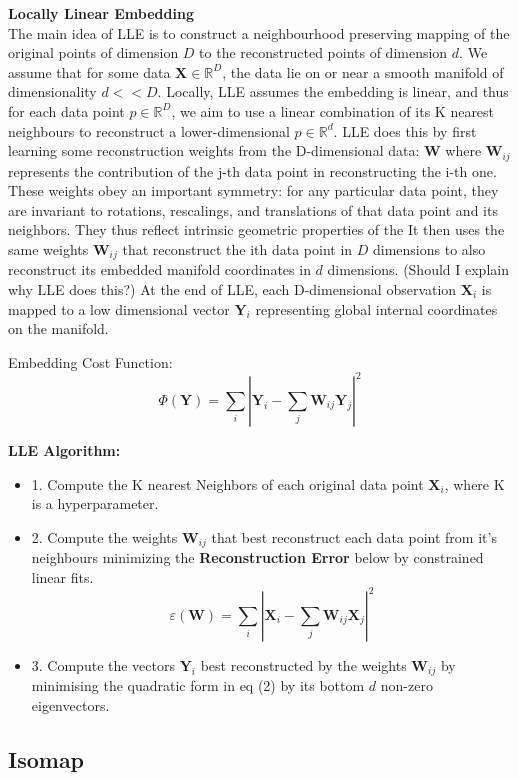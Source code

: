 \documentclass[12pt]{report}
\begin{document}
\textbf{Locally Linear Embedding} 
\\
The main idea of LLE is to construct a neighbourhood preserving mapping of the original points of dimension $D$ to the reconstructed points of dimension $d$. We assume that for some data $\textbf{X} \in \mathbb{R}^{D}$, the data lie on or near a smooth manifold of dimensionality $d << D$. Locally, LLE assumes the embedding is linear, and thus for each data point $p \in \mathbb{R}^D$, we aim to use a linear combination of its K nearest neighbours to reconstruct a lower-dimensional $p \in \mathbb{R}^d$. LLE does this by first learning some reconstruction weights from the D-dimensional data: $\textbf{W}$ where $\textbf{W}_{ij}$ represents the contribution of the j-th data point in reconstructing the i-th one. These weights obey an important symmetry: for any particular data point, they are invariant to rotations, rescalings, and translations of that data point and its neighbors. They thus reflect intrinsic geometric properties of the  It then uses the same weights $\textbf{W}_{ij}$ that reconstruct the ith data point in $D$ dimensions to also reconstruct its embedded manifold coordinates in $d$ dimensions. (Should I explain why LLE does this?) At the end of LLE, each  D-dimensional observation $\textbf{X}_i$ is mapped to a low dimensional vector $\textbf{Y}_i$ representing global internal coordinates on the manifold.

Embedding Cost Function:
$$\Phi(\textbf{Y}) = \sum_i |\textbf{Y}_i - \sum_j \textbf{W}_{ij}\textbf{Y}_j|^2$$

\textbf{LLE Algorithm:}
\begin{itemize}
    \item 1. Compute the K nearest Neighbors of each original data point $\textbf{X}_i$, where K is a hyperparameter.
    \item 2. Compute the weights $\textbf{W}_{ij}$ that best reconstruct each data point from it's neighbours minimizing the \textbf{Reconstruction Error} below by constrained linear fits.
$$\varepsilon (\textbf{W}) = \sum_i|\textbf{X}_i - \sum_j \textbf{W}_{ij} \textbf{X}_j|^2$$
    \item 3. Compute the vectors $\textbf{Y}_i$ best reconstructed by the weights $\textbf{W}_{ij}$ by minimising the quadratic form in eq (2) by its bottom $d$ non-zero eigenvectors.
\end{itemize}

\newpage

\subsection*{Isomap}
\end{document}
